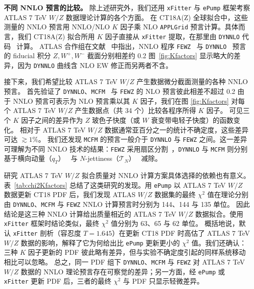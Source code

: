 {\bf 不同 NNLO 预言的比较。}
除上述研究外，我们还用 \texttt{xFitter} 与 \texttt{ePump} 框架考察 ATLAS 7 TeV $W/Z$ 数据理论计算的各个方面。
%
在 CT18A(Z) 全球拟合中，这些测量的 NNLO 预言用 NNLO/NLO $K$ 因子乘 NLO \texttt{APPLGrid} 预言计算。具体而言，我们 CT18A(Z) 拟合所用 $K$ 因子直接从 \texttt{xFitter} 提取，在那里由 \texttt{DYNNLO} 代码~\cite{Catani:2007vq,Catani:2009sm} 计算。
ATLAS 合作组在文献~\cite{Aaboud:2016btc} 中指出，NNLO 程序
\texttt{FEWZ}~\cite{Gavin:2010az,Gavin:2012sy,Li:2012wna} 与 \texttt{DYNNLO}~\cite{Catani:2007vq,Catani:2009sm} 预言的 fiducial 积分 $Z,W^{+},W^{-}$ 截面分别相差约 0.2%
图~\ref{fig:Kfactors} 显示略大的差异，因为 \texttt{DYNNLO} 曲线含 NLO EW 修正而另两者不含。


接下来，我们希望比较 ATLAS 7 TeV $W/Z$ 产生数据微分截面测量的各种 NNLO 预言。
首先验证了 \texttt{DYNNLO}、\texttt{MCFM}~\cite{Boughezal:2016wmq,MCFM8}
与 \texttt{FEWZ} 的 NLO 预言彼此相差不超过 0.2%
由于 NNLO 预言可表示为 NLO 预言乘以其 $K$ 因子，我们在图 \ref{fig:Kfactors} 对每个 ATLAS 7 TeV $W/Z$ 产生数据点（共 34 个）比较各程序所得 $K$ 因子。
可见三个 $K$ 因子之间的差异作为 $Z$ 玻色子快度（或 $W$ 衰变带电轻子快度）的函数变化。
相对于 ATLAS 7 TeV $W/Z$ 数据通常亚百分之一的统计不确定度，这些差异可达 $\gtrsim\!1\%$。
我们还发现 \texttt{MCFM} 的预言一般介于 \texttt{DYNNLO} 与 \texttt{FEWZ} 之间。这一差异可理解为不同 NNLO 技术的结果：\texttt{FEWZ} 采用扇区分割~\cite{Binoth:2000ps,Anastasiou:2003gr,Anastasiou:2005qj}，\texttt{DYNNLO} 与 \texttt{MCFM}
则分别基于横向动量（$q_T$）~\cite{Catani:2007vq,Catani:2009sm} 与 $N$-jettiness（$\mathcal{T}_N$）~\cite{Boughezal:2016wmq} 减除。

研究 ATLAS 7 TeV $W/Z$ 拟合质量对 NNLO 计算方案具体选择的依赖也有意义。
表~\ref{tab:chi2Kfactors} 总结了这类研究的发现。用 \texttt{ePump} 以 ATLAS 7 TeV $W/Z$ 数据更新 CT18 PDF 后，我们发现 ATLAS $W/Z$ 数据集的最终 $\chi^2$ 值在理论分别由 \texttt{DYNNLO}、\texttt{MCFM} 与 \texttt{FEWZ} NNLO 计算预言时分别为 144、144 与 135 单位。
因此结论是这三种 NNLO 计算给出质量相近的 ATLAS 7 TeV $W/Z$ 数据拟合。使用 \texttt{xFitter} 框架时结论类似，最终 $\chi^2$ 值分别为 63、65 与 62 单位。
概括地说，默认 \texttt{xFitter} 剖析（容忍度 $T\! =\! 1.645$）在更新 CT18 PDF 时高估了 ATLAS 7 TeV $W/Z$ 数据的影响，解释了它为何给出比 \texttt{ePump} 更新更小的 $\chi^2$ 值。我们还确认：三种 $K$ 因子更新的 PDF 彼此略有差异，但与实验不确定度引起的同样系统移动相比可以忽略。
总之，同一 PDF 组下 \texttt{DYNNLO}、\texttt{MCFM} 与 \texttt{FEWZ} 对 ATLAS 7 TeV $W/Z$ 数据的 NNLO 理论预言存在可察觉的差异；另一方面，经 \texttt{ePump} 或 \texttt{xFitter} 更新 PDF 后，三者的最终 $\chi^2$ 与 PDF 只显示轻微差异。

